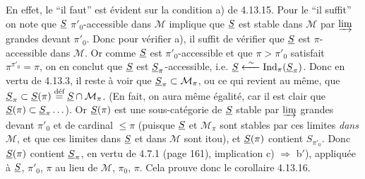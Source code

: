 En effet, le “il faut” est évident sur la condition a) de 4.13.15. Pour le “il suffit” on note que $\underline{S}$ $\pi'_0$-accessible dans $\mathcal{M}$ implique que $\underline{S}$ est stable dans $\mathcal{M}$ par $\varinjlim$ grandes devant $\pi'_0$. Donc pour vérifier a), il suffit de vérifier que $\underline{S}$ est $\pi$-accessible dans $\mathcal{M}$. Or comme $\underline{S}$ est $\pi'_0$-accessible et que $\pi > \pi'_0$ satisfait $\pi^{\pi'_0} = \pi$, on en conclut que $\underline{S}$ est $\underline{S}_\pi$-accessible, i.e. $\underline{S} \xleftarrow{\ \sim\ } \mathrm{Ind}_\pi(\underline{S}_\pi)$. Donc en vertu de 4.13.3, il reste à voir que $\underline{S}_\pi \subset \mathcal{M}_\pi$, ou ce qui revient au même, que $\underline{S}_\pi \subset \underline{S}(\pi) \overset{\text{déf}}{=} \underline{S} \cap \mathcal{M}_\pi$. (En fait, on aura même égalité, car il est clair que $\underline{S}(\pi) \subset \underline{S}_\pi \ldots$). Or $\underline{S}(\pi)$ est une sous-catégorie de $\underline{S}$ stable par $\varinjlim$ grandes devant $\pi'_0$ et de cardinal $\leqslant \pi$ (puisque $\underline{S}$ et $\mathcal{M}_\pi$ sont stables par ces limites \textit{dans} $\mathcal{M}$, et que ces limites dans $\underline{S}$ et dans $\mathcal{M}$ sont itou), et $\underline{S}(\pi)$ contient $S_{\pi'_0}$. Donc $\underline{S}(\pi)$ contient $\underline{S}_\pi$, en vertu de 4.7.1 (page 161), implication c) $\Longrightarrow$ b$'$), appliquée à $\underline{S}$, $\pi'_0$, $\pi$ au lieu de $\mathcal{M}$, $\pi_0$, $\pi$. Cela prouve donc le corollaire 4.13.16. %

